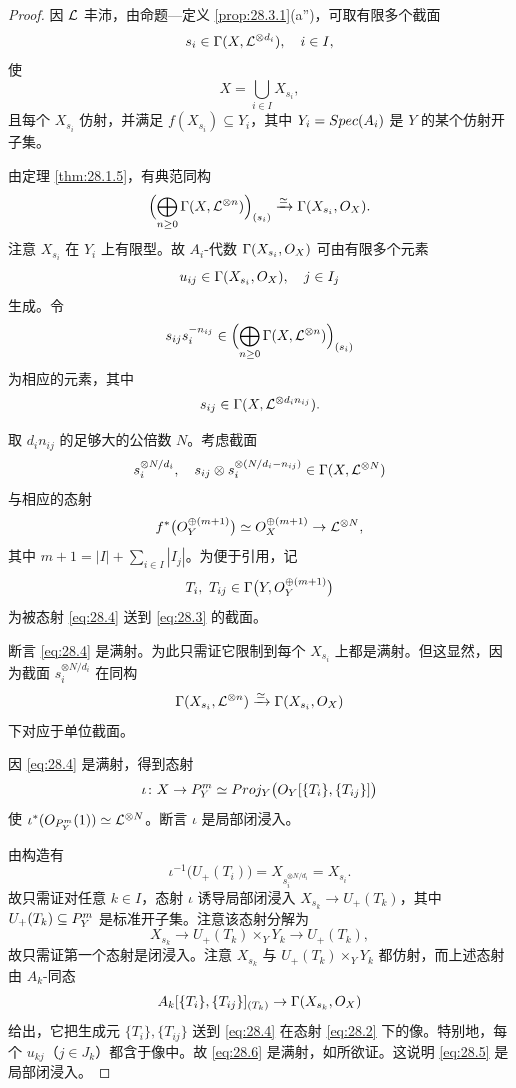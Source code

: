 \begin{proof}
因 $\mathcal{L}$ 丰沛，由命题—定义 \ref{prop:28.3.1}(a'')，可取有限多个截面
\[
s_i\in\Gamma(X,\mathcal{L}^{\otimes d_i}),\quad i\in I,
\]
使
\[
X=\bigcup_{i\in I}X_{s_i},
\]
且每个 $X_{s_i}$ 仿射，并满足 $f(X_{s_i})\subseteq Y_i$，其中 $Y_i=Spec(A_i)$ 是 $Y$ 的某个仿射开子集。

由定理 \ref{thm:28.1.5}，有典范同构
\begin{equation}
\Bigl(\bigoplus_{n\ge 0}\Gamma(X,\mathcal{L}^{\otimes n})\Bigr)_{(s_i)}\xrightarrow{\simeq}\Gamma(X_{s_i},O_X). \label{eq:28.2}
\end{equation}
注意 $X_{s_i}$ 在 $Y_i$ 上有限型。故 $A_i$-代数 $\Gamma(X_{s_i},O_X)$ 可由有限多个元素
\[
u_{ij}\in\Gamma(X_{s_i},O_X),\quad j\in I_j
\]
生成。令
\[
s_{ij}s_i^{-n_{ij}}\in\Bigl(\bigoplus_{n\ge 0}\Gamma(X,\mathcal{L}^{\otimes n})\Bigr)_{(s_i)}
\]
为相应的元素，其中
\[
s_{ij}\in\Gamma(X,\mathcal{L}^{\otimes d_in_{ij}}).
\]

取 $d_in_{ij}$ 的足够大的公倍数 $N$。考虑截面
\begin{equation}
s_i^{\otimes N/d_i},\quad s_{ij}\otimes s_i^{\otimes (N/d_i-n_{ij})}\in\Gamma(X,\mathcal{L}^{\otimes N}) \label{eq:28.3}
\end{equation}
与相应的态射
\begin{equation}
f^*\bigl(O_Y^{\oplus(m+1)}\bigr)\simeq O_X^{\oplus(m+1)}\to\mathcal{L}^{\otimes N}, \label{eq:28.4}
\end{equation}
其中 $m+1=|I|+\sum_{i\in I}|I_j|$。为便于引用，记
\[
T_i,\ T_{ij}\in\Gamma\bigl(Y,\cO_Y^{\oplus(m+1)}\bigr)
\]
为被态射 \eqref{eq:28.4} 送到 \eqref{eq:28.3} 的截面。

断言 \eqref{eq:28.4} 是满射。为此只需证它限制到每个 $X_{s_i}$ 上都是满射。但这显然，因为截面 $s_i^{\otimes N/d_i}$ 在同构
\[
\Gamma(X_{s_i},\mathcal{L}^{\otimes n})\xrightarrow{\simeq}\Gamma(X_{s_i},O_X)
\]
下对应于单位截面。

因 \eqref{eq:28.4} 是满射，得到态射
\begin{equation}
\iota\colon X\to P^m_Y\simeq Proj_Y\bigl(O_Y[\{T_i\},\{T_{ij}\}]\bigr) \label{eq:28.5}
\end{equation}
使 $\iota^*(O_{P^m_Y}(1))\simeq\mathcal{L}^{\otimes N}$。断言 $\iota$ 是局部闭浸入。

由构造有
\[
\iota^{-1}\bigl(U_+(T_i)\bigr)=X_{s_i^{\otimes N/d_i}}=X_{s_i}.
\]
故只需证对任意 $k\in I$，态射 $\iota$ 诱导局部闭浸入 $X_{s_k}\to U_+(T_k)$，其中 $U_+(T_k)\subseteq P^m_Y$ 是标准开子集。注意该态射分解为
\[
X_{s_k}\to U_+(T_k)\times_Y Y_k\to U_+(T_k),
\]
故只需证第一个态射是闭浸入。注意 $X_{s_k}$ 与 $U_+(T_k)\times_Y Y_k$ 都仿射，而上述态射由 $A_k$-同态
\begin{equation}
A_k[\{T_i\},\{T_{ij}\}]_{(T_k)}\to\Gamma(X_{s_k},O_X) \label{eq:28.6}
\end{equation}
给出，它把生成元 $\{T_i\},\{T_{ij}\}$ 送到 \eqref{eq:28.4} 在态射 \eqref{eq:28.2} 下的像。特别地，每个 $u_{kj}$（$j\in J_k$）都含于像中。故 \eqref{eq:28.6} 是满射，如所欲证。这说明 \eqref{eq:28.5} 是局部闭浸入。


\end{proof}
